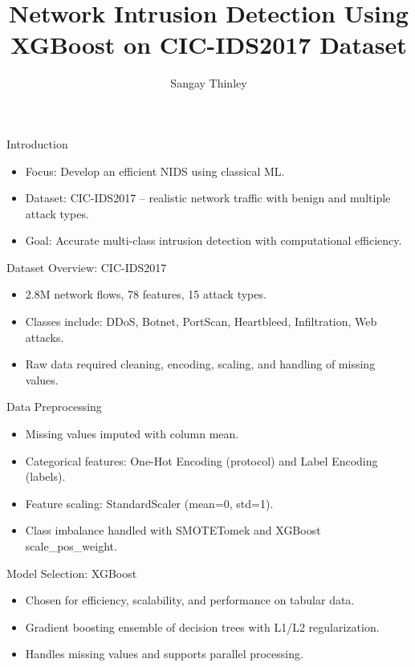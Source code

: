 \documentclass{beamer}
\title{Network Intrusion Detection Using XGBoost on CIC-IDS2017 Dataset}
\author{Sangay Thinley}
\institute{School of Built Environment, Engineering and Computing\\ Leeds Beckett University}
\date{}
\begin{document}
\frame{\titlepage}

\begin{frame}
{Introduction}
\begin{itemize}
    \item Focus: Develop an efficient NIDS using classical ML.
    \item Dataset: CIC-IDS2017 – realistic network traffic with benign and multiple attack types.
    \item Goal: Accurate multi-class intrusion detection with computational efficiency.
\end{itemize}
\end{frame}

\begin{frame}{Dataset Overview: CIC-IDS2017}
\begin{itemize}
    \item 2.8M network flows, 78 features, 15 attack types.
    \item Classes include: DDoS, Botnet, PortScan, Heartbleed, Infiltration, Web attacks.
    \item Raw data required cleaning, encoding, scaling, and handling of missing values.
\end{itemize}
\end{frame}

\begin{frame}{Data Preprocessing}
\begin{itemize}
    \item Missing values imputed with column mean.
    \item Categorical features: One-Hot Encoding (protocol) and Label Encoding (labels).
    \item Feature scaling: StandardScaler (mean=0, std=1).
    \item Class imbalance handled with SMOTETomek and XGBoost scale\_pos\_weight.
\end{itemize}
\end{frame}

\begin{frame}{Model Selection: XGBoost}
\begin{itemize}
    \item Chosen for efficiency, scalability, and performance on tabular data.
    \item Gradient boosting ensemble of decision trees with L1/L2 regularization.
    \item Handles missing values and supports parallel processing.
\end{itemize}
\end{frame}
\end{document}

